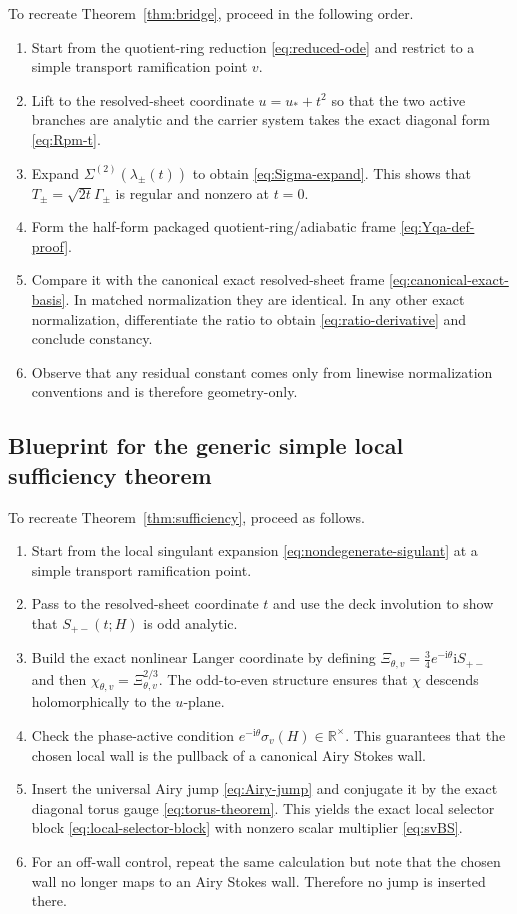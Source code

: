 \documentclass[11pt]{article}
\numberwithin{equation}{section}
\theoremstyle{definition}
\newcommand{\ii}{\mathrm i}
\begin{document}
To recreate Theorem~\ref{thm:bridge}, proceed in the following order.
\begin{enumerate}
  \item Start from the quotient-ring reduction \eqref{eq:reduced-ode} and restrict to a simple transport ramification point $v$.
  \item Lift to the resolved-sheet coordinate $u=u_*+t^2$ so that the two active branches are analytic and the carrier system takes the exact diagonal form \eqref{eq:Rpm-t}.
  \item Expand $\Sigma^{(2)}(\lambda_\pm(t))$ to obtain \eqref{eq:Sigma-expand}. This shows that $T_\pm=\sqrt{2t}\Gamma_\pm$ is regular and nonzero at $t=0$.
  \item Form the half-form packaged quotient-ring/adiabatic frame \eqref{eq:Yqa-def-proof}.
  \item Compare it with the canonical exact resolved-sheet frame \eqref{eq:canonical-exact-basis}. In matched normalization they are identical. In any other exact normalization, differentiate the ratio to obtain \eqref{eq:ratio-derivative} and conclude constancy.
  \item Observe that any residual constant comes only from linewise normalization conventions and is therefore geometry-only.
\end{enumerate}

\subsection{Blueprint for the generic simple local sufficiency theorem}

To recreate Theorem~\ref{thm:sufficiency}, proceed as follows.
\begin{enumerate}
  \item Start from the local singulant expansion \eqref{eq:nondegenerate-sigulant} at a simple transport ramification point.
  \item Pass to the resolved-sheet coordinate $t$ and use the deck involution to show that $S_{+-}(t;H)$ is odd analytic.
  \item Build the exact nonlinear Langer coordinate by defining $\Xi_{\theta,v}=\frac34 e^{-\ii\theta}\ii S_{+-}$ and then $\chi_{\theta,v}=\Xi_{\theta,v}^{2/3}$. The odd-to-even structure ensures that $\chi$ descends holomorphically to the $u$-plane.
  \item Check the phase-active condition $e^{-\ii\theta}\sigma_v(H)\in\mathbb R^\times$. This guarantees that the chosen local wall is the pullback of a canonical Airy Stokes wall.
  \item Insert the universal Airy jump \eqref{eq:Airy-jump} and conjugate it by the exact diagonal torus gauge \eqref{eq:torus-theorem}. This yields the exact local selector block \eqref{eq:local-selector-block} with nonzero scalar multiplier \eqref{eq:svBS}.
  \item For an off-wall control, repeat the same calculation but note that the chosen wall no longer maps to an Airy Stokes wall. Therefore no jump is inserted there.
\end{enumerate}
\end{document}

